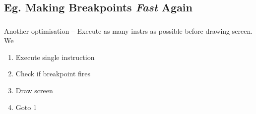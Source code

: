 \documentclass{beamer}
\begin{document}
\subsection{Eg. Making Breakpoints \emph{Fast} Again}
\begin{frame}[fragile]
\frametitle{\insertsubsection}


\vfill

Another optimisation -- Execute as many instrs as possible before drawing screen. We 

\begin{enumerate}
\item Execute single instruction
\item Check if breakpoint fires
\item Draw screen
\item Goto 1
\end{enumerate}

\end{frame}
\end{document}
